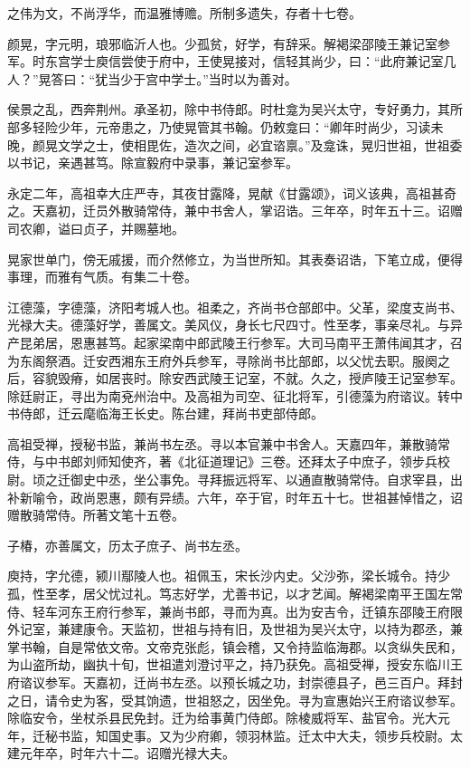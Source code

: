 \documentclass[]{article}
\begin{document}
之伟为文，不尚浮华，而温雅博赡。所制多遗失，存者十七卷。

颜晃，字元明，琅邪临沂人也。少孤贫，好学，有辞采。解褐梁邵陵王兼记室参军。时东宫学士庾信尝使于府中，王使晃接对，信轻其尚少，曰：``此府兼记室几人？''晃答曰：``犹当少于宫中学士。''当时以为善对。

侯景之乱，西奔荆州。承圣初，除中书侍郎。时杜龛为吴兴太守，专好勇力，其所部多轻险少年，元帝患之，乃使晃管其书翰。仍敕龛曰：``卿年时尚少，习读未晚，颜晃文学之士，使相毘佐，造次之间，必宜谘禀。''及龛诛，晃归世祖，世祖委以书记，亲遇甚笃。除宣毅府中录事，兼记室参军。

永定二年，高祖幸大庄严寺，其夜甘露降，晃献《甘露颂》，词义该典，高祖甚奇之。天嘉初，迁员外散骑常侍，兼中书舍人，掌诏诰。三年卒，时年五十三。诏赠司农卿，谥曰贞子，并赐墓地。

晃家世单门，傍无戚援，而介然修立，为当世所知。其表奏诏诰，下笔立成，便得事理，而雅有气质。有集二十卷。

江德藻，字德藻，济阳考城人也。祖柔之，齐尚书仓部郎中。父革，梁度支尚书、光禄大夫。德藻好学，善属文。美风仪，身长七尺四寸。性至孝，事亲尽礼。与异产昆弟居，恩惠甚笃。起家梁南中郎武陵王行参军。大司马南平王萧伟闻其才，召为东阁祭酒。迁安西湘东王府外兵参军，寻除尚书比部郎，以父忧去职。服阕之后，容貌毁瘠，如居丧时。除安西武陵王记室，不就。久之，授庐陵王记室参军。除廷尉正，寻出为南兗州治中。及高祖为司空、征北将军，引德藻为府谘议。转中书侍郎，迁云麾临海王长史。陈台建，拜尚书吏部侍郎。

高祖受禅，授秘书监，兼尚书左丞。寻以本官兼中书舍人。天嘉四年，兼散骑常侍，与中书郎刘师知使齐，著《北征道理记》三卷。还拜太子中庶子，领步兵校尉。顷之迁御史中丞，坐公事免。寻拜振远将军、以通直散骑常侍。自求宰县，出补新喻令，政尚恩惠，颇有异绩。六年，卒于官，时年五十七。世祖甚悼惜之，诏赠散骑常侍。所著文笔十五卷。

子椿，亦善属文，历太子庶子、尚书左丞。

庾持，字允德，颍川鄢陵人也。祖佩玉，宋长沙内史。父沙弥，梁长城令。持少孤，性至孝，居父忧过礼。笃志好学，尤善书记，以才艺闻。解褐梁南平王国左常侍、轻车河东王府行参军，兼尚书郎，寻而为真。出为安吉令，迁镇东邵陵王府限外记室，兼建康令。天监初，世祖与持有旧，及世祖为吴兴太守，以持为郡丞，兼掌书翰，自是常依文帝。文帝克张彪，镇会稽，又令持监临海郡。以贪纵失民和，为山盗所劫，幽执十旬，世祖遣刘澄讨平之，持乃获免。高祖受禅，授安东临川王府谘议参军。天嘉初，迁尚书左丞。以预长城之功，封崇德县子，邑三百户。拜封之日，请令史为客，受其饷遗，世祖怒之，因坐免。寻为宣惠始兴王府谘议参军。除临安令，坐杖杀县民免封。迁为给事黄门侍郎。除棱威将军、盐官令。光大元年，迁秘书监，知国史事。又为少府卿，领羽林监。迁太中大夫，领步兵校尉。太建元年卒，时年六十二。诏赠光禄大夫。
\end{document}
